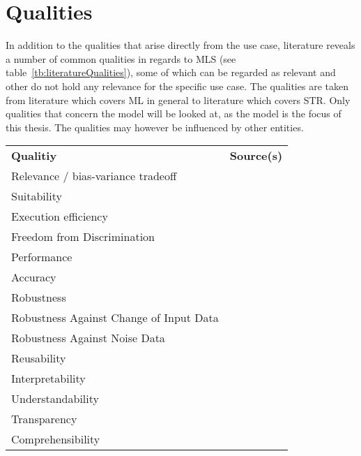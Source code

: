 \section{Qualities}
In addition to the qualities that arise directly from the use case, literature reveals a number of
common qualities in regards to \ac{MLS} (see table~\ref{tb:literatureQualities}), some of which
can be regarded as relevant and other do not hold any relevance for the specific use case.
The qualities are taken from literature which covers \ac{ML} in general to literature
which covers \ac{STR}.
Only qualities that concern the model will be looked at, as the model is the focus of this thesis.
The qualities may however be influenced by other entities.


\begin{table}[h]\label{tb:LiteratureQualitiesModel}
    \centering
    \begin{tabular}{p{} p{}}
        \textbf{Qualitiy} & \textbf{Source(s)} \\
        Relevance / bias-variance tradeoff &~\cite{siebert_construction_2021, zhang_machine_2020} \\
        Suitability &~\cite{siebert_construction_2021} \\
        Execution efficiency &~\cite{siebert_construction_2021} \\
        Freedom from Discrimination &~\cite{vogelsang_requirements_2019} \\
        Performance &~\cite{ashmore_assuring_2021,vogelsang_requirements_2019} \\
        Accuracy &~\cite{nakamichi_requirements-driven_2020} \\
        Robustness &~\cite{ashmore_assuring_2021, hu_towards_2020, siebert_construction_2021} \\
        Robustness Against Change of Input Data &~\cite{nakamichi_requirements-driven_2020} \\
        Robustness Against Noise Data &~\cite{nakamichi_requirements-driven_2020} \\
        Reusability &~\cite{ashmore_assuring_2021} \\
        Interpretability &~\cite{ashmore_assuring_2021, siebert_construction_2021, zhang_machine_2020} \\
        Understandability &~\cite{nakamichi_requirements-driven_2020} \\
        Transparency &~\cite{arpteg_software_2018} \\
        Comprehensibility &~\cite{ashmore_assuring_2021} \\

\end{tabular}
\end{table}
